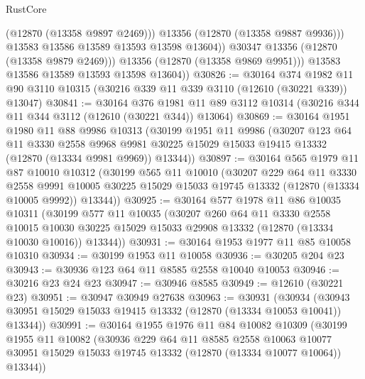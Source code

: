 \begin{lexlean}{RustCore}
\begin{coremodule}
                    (@12870 (@13358 @9897 @2469)))
                  @13356
                  (@12870 (@13358 @9887 @9936)))
                @13583
                @13586
                @13589
                @13593
                @13598
                @13604))
            @30347
            @13356
            (@12870 (@13358 @9879 @2469)))
          @13356
          (@12870 (@13358 @9869 @9951)))
        @13583
        @13586
        @13589
        @13593
        @13598
        @13604))
@30826 := @30164
    @374
    @1982
    @11
    @90
    @3110
    @10315
    (@30216 @339 @11 @339 @3110 (@12610 (@30221 @339)) @13047)
@30841 := @30164
    @376
    @1981
    @11
    @89
    @3112
    @10314
    (@30216 @344 @11 @344 @3112 (@12610 (@30221 @344)) @13064)
@30869 := @30164
    @1951
    @1980
    @11
    @88
    @9986
    @10313
    (@30199
      @1951
      @11
      @9986
      (@30207
        @123
        @64
        @11
        @3330
        @2558
        @9968
        @9981
        @30225
        @15029
        @15033
        @19415
        @13332
        (@12870 (@13334 @9981 @9969))
        @13344))
@30897 := @30164
    @565
    @1979
    @11
    @87
    @10010
    @10312
    (@30199
      @565
      @11
      @10010
      (@30207
        @229
        @64
        @11
        @3330
        @2558
        @9991
        @10005
        @30225
        @15029
        @15033
        @19745
        @13332
        (@12870 (@13334 @10005 @9992))
        @13344))
@30925 := @30164
    @577
    @1978
    @11
    @86
    @10035
    @10311
    (@30199
      @577
      @11
      @10035
      (@30207
        @260
        @64
        @11
        @3330
        @2558
        @10015
        @10030
        @30225
        @15029
        @15033
        @29908
        @13332
        (@12870 (@13334 @10030 @10016))
        @13344))
@30931 := @30164 @1953 @1977 @11 @85 @10058 @10310
@30934 := @30199 @1953 @11 @10058
@30936 := @30205 @204 @23
@30943 := @30936 @123 @64 @11 @8585 @2558 @10040 @10053
@30946 := @30216 @23 @24 @23
@30947 := @30946 @8585
@30949 := @12610 (@30221 @23)
@30951 := @30947 @30949 @27638
@30963 := @30931
    (@30934 (@30943 @30951 @15029 @15033 @19415 @13332 (@12870 (@13334 @10053 @10041)) @13344))
@30991 := @30164
    @1955
    @1976
    @11
    @84
    @10082
    @10309
    (@30199
      @1955
      @11
      @10082
      (@30936
        @229
        @64
        @11
        @8585
        @2558
        @10063
        @10077
        @30951
        @15029
        @15033
        @19745
        @13332
        (@12870 (@13334 @10077 @10064))
        @13344))

\end{coremodule}
\end{lexlean}
